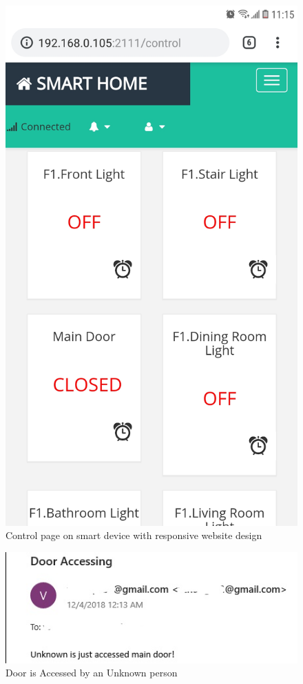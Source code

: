 \begin{figure}[!htbp]
    \begin{center}
    \includegraphics[scale=0.3]{images/controlOnCell.jpg}
    \caption{Control page on smart device with responsive website design}
    \label{fig:controlOnCell}
    \end{center}
\end{figure}
\begin{figure}[!htb]
    \begin{center}
    \includegraphics[scale=0.8]{images/doorAccess1.jpg}
    \caption{Door is Accessed by an Unknown person}
    \label{fig:doorAccess1}
    \end{center}
\end{figure}
